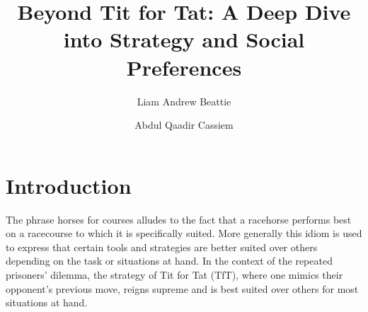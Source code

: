 \documentclass[11pt,preprint]{elsarticle}
\numberwithin{equation}{section}
\numberwithin{figure}{section}
\numberwithin{table}{section}
\begin{document}
\begin{frontmatter}  %

\title{Beyond Tit for Tat: A Deep Dive into Strategy and Social
Preferences}





\author[Add1]{Liam Andrew Beattie}

\author[Add1]{Abdul Qaadir Cassiem}




\address[Add1]{Microeconomics 871, Stellenbosch University, South
Africa}



\vspace{1cm}





\vspace{0.5cm}

\end{frontmatter}

\setcounter{footnote}{0}



\pagestyle{fancy}
\chead{}
\rhead{}
\lfoot{}
\lhead{}
\cfoot{}


\headsep 35pt %




\section{\texorpdfstring{Introduction
\label{Introduction}}{Introduction }}\label{introduction}

The phrase horses for courses alludes to the fact that a racehorse
performs best on a racecourse to which it is specifically suited. More
generally this idiom is used to express that certain tools and
strategies are better suited over others depending on the task or
situations at hand. In the context of the repeated prisoners' dilemma,
the strategy of Tit for Tat (TfT), where one mimics their opponent's
previous move, reigns supreme and is best suited over others for most
situations at hand.
\end{document}
